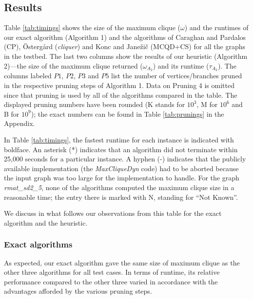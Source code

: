 \subsection{Results}
\label{sec:exp-results}



Table \ref{tab:timings} shows the size of the maximum clique ($\omega$) and the runtimes  of our exact algorithm (Algorithm 1) and the algorithms of Caraghan and Pardalos (CP), 
\"{O}sterg{\aa}rd ({\it cliquer}) 
and Konc and Jane\v{z}i\v{c}  (MCQD+CS) for all the graphs in the testbed. 
The last two columns show the results of our heuristic (Algorithm 2)---the size of the maximum clique 
returned ($\omega_{A_2}$)  and its runtime ($\tau_{A_2}$). 
The columns labeled $P1$, $P2$, $P3$ and $P5$ list the number of 
vertices/branches pruned in the respective pruning steps of Algorithm 1.
Data on Pruning 4 is omitted since that pruning is used by all of the algorithms compared in the table. The displayed pruning numbers have been rounded  (K stands for $10^3$, M for $10^6$ and B for $10^9$);
the exact numbers can be found in Table \ref{tab:prunings} in the Appendix.

In Table \ref{tab:timings}, the fastest runtime for each instance is indicated with boldface. 
An asterisk (*) indicates that an algorithm did not terminate within 25,000 seconds for a particular
instance. A hyphen (-) indicates that the publicly available implementation 
(the {\it MaxCliqueDyn} code) had to be aborted because the input graph was too large 
for the implementation to handle.
For the graph {\it rmat\_sd2\_5}, none of the algorithms computed the maximum clique size in 
a reasonable time; the entry there is marked with N, standing for  ``Not Known''.

We discuss in what follows our observations from this table
for the exact algorithm and the heuristic.

\subsubsection{Exact algorithms}
\label{sec:exp-exact}

As expected, our exact algorithm gave the same size of maximum clique as the other
three algorithms for all test cases. 
In terms of runtime,  its relative performance compared to the other three varied
in accordance with the advantages afforded by the various pruning steps.  


